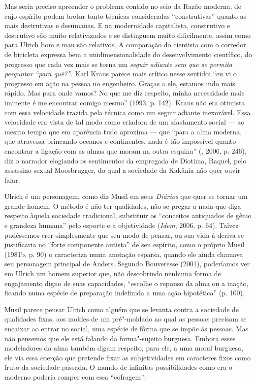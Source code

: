 Mas seria preciso apreender o problema contido no seio da Razão moderna,
de cujo espírito podem brotar tanto técnicas consideradas
``construtivas'' quanto as mais destrutivas e desumanas. E na
modernidade capitalista, construtivo e destrutivo são muito
relativizados e se distinguem muito dificilmente, assim como para Ulrich
bom e mau são relativos. A comparação do cientista com o corredor de
bicicleta expressa bem a unidimensionalidade do desenvolvimento
científico, do progresso que cada vez mais se torna um \emph{seguir
adiante sem que se permita perguntar ``para quê?''}. Karl Kraus parece
mais crítico nesse sentido: ``eu vi o progresso em ação na pessoa no
engenheiro. Graças a ele, estamos indo mais rápido. Mas para onde vamos?
No que me diz respeito, minha necessidade mais iminente é me encontrar
comigo mesmo'' (1993, p. 142). Kraus não era otimista com essa
velocidade trazida pela técnica como um seguir adiante inexorável. Essa
velocidade era vista de tal modo como criadora de um afastamento social
--- ao mesmo tempo que em aparência tudo aproxima --- que ``para a alma
moderna, que atravessa brincando oceanos e continentes, nada é tão
impossível quanto encontrar a ligação com as almas que moram na outra
esquina'' (, 2006, p. 246), diz o narrador elogiando os
sentimentos da empregada de Diotima, Raquel, pelo assassino sexual
Moosbrugger, do qual a sociedade da Kakânia não quer ouvir falar.

Ulrich é um personagem, como diz Musil em seus \emph{Diários} que quer
se tornar um grande homem. O método é não ter qualidades, não se pregar
a nada que diga respeito àquela sociedade tradicional, substituir os
``conceitos antiquados de gênio e grandeza humana'' pelo esporte e a
objetividade (\emph{Idem}, 2006, p. 64). Talvez pudéssemos crer simplesmente
que seu modo de pensar, ou sua vida à deriva se justificaria no ``forte
componente autista'' de seu espírito, como o próprio Musil (1981b, p.
90) o caracteriza numa anotação esparsa, quando ele ainda chamava seu
personagem principal de Anders. Segundo Bouveresse (2001), poderíamos
ver em Ulrich um homem superior que, não descobrindo nenhuma forma de
engajamento digno de suas capacidades, ``escolhe o repouso da alma ou a
inação, ficando numa espécie de preparação indefinida a uma ação
hipotética'' (p. 100).

Musil parece pensar Ulrich como alguém que se levanta contra a sociedade
de qualidades fixas, aos moldes de um pré"-moldado ao qual as pessoas
precisam se encaixar ao entrar no social, uma espécie de fôrma que se
impõe às pessoas. Mas não pensemos que ele está falando da forma"-sujeito
burguesa. Embora esses modeladores da alma também digam respeito, para
ele, a uma moral burguesa, ele via essa coerção que pretende fixar as
subjetividades em caracteres fixos como fruto da sociedade passada. O
mundo de infinitas possibilidades como era o moderno poderia romper com
essa ``cofragem'':

